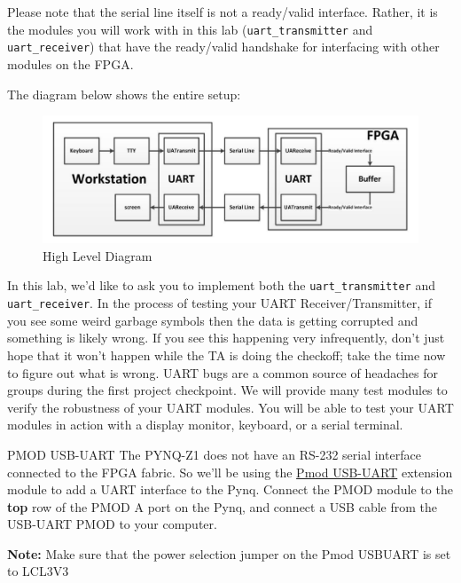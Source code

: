 \documentclass[11pt]{article}
\makeatletter
\renewcommand{\subsection}
{\@startsection {subsection}{1}{0pt}
 {-1ex}
 {0.5ex}
 {\bfseries\normalsize}}
\makeatother
\begin{document}
Please note that the serial line itself is not a ready/valid interface.
Rather, it is the modules you will work with in this lab (\verb|uart_transmitter| and \verb|uart_receiver|) that have the ready/valid handshake for interfacing with other modules on the FPGA.

The diagram below shows the entire setup:

\begin{figure}[H]
  \centerline{\includegraphics[width=6in]{figs/high_level_diagram.png}}
  \caption{High Level Diagram}
\end{figure}

In this lab, we'd like to ask you to implement both the \verb|uart_transmitter| and \verb|uart_receiver|.
In the process of testing your UART Receiver/Transmitter, if you see some weird garbage symbols then the data is getting corrupted and something is likely wrong.
If you see this happening very infrequently, don't just hope that it won't happen while the TA is doing the checkoff; take the time now to figure out what is wrong.
UART bugs are a common source of headaches for groups during the first project checkpoint.
We will provide many test modules to verify the robustness of your UART modules. You will be able to test your UART modules in action with a display monitor, keyboard, or a serial terminal.

\subsection{PMOD USB-UART}
The PYNQ-Z1 does not have an RS-232 serial interface connected to the FPGA fabric.
So we'll be using the \href{https://store.digilentinc.com/pmod-usbuart-usb-to-uart-interface/}{Pmod USB-UART} extension module to add a UART interface to the Pynq.
Connect the PMOD module to the \textbf{top} row of the PMOD A port on the Pynq, and connect a USB cable from the USB-UART PMOD to your computer.

\textbf{Note:} Make sure that the power selection jumper on the Pmod USBUART is set to LCL3V3
\end{document}
